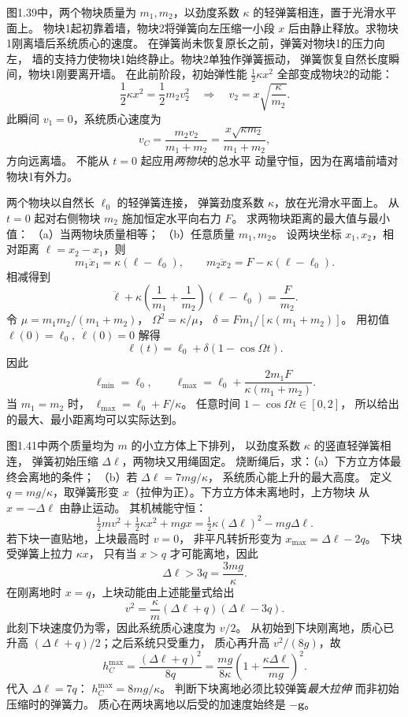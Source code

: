 图1.39中，两个物块质量为 $m_1,m_2$，以劲度系数
$\kappa$ 的轻弹簧相连，置于光滑水平面上。
物块1起初靠着墙，物块2将弹簧向左压缩一小段
$x$ 后由静止释放。求物块1刚离墙后系统质心的速度。
\exsolution
在弹簧尚未恢复原长之前，弹簧对物块1的压力向左，
墙的支持力使物块1始终静止。物块2单独作弹簧振动，
弹簧恢复自然长度瞬间，物块1刚要离开墙。
在此前阶段，初始弹性能
$\tfrac12\kappa x^2$ 全部变成物块2的动能：
\[
\frac12\kappa x^2=\frac12m_2v_2^2
\quad\Longrightarrow\quad
v_2=x\sqrt{\frac{\kappa}{m_2}}.
\]
此瞬间 $v_1=0$，系统质心速度为
\[
\boxed{v_C=\frac{m_2v_2}{m_1+m_2}
=\frac{x\sqrt{\kappa m_2}}{m_1+m_2}},
\]
方向远离墙。
\excheck 不能从 $t=0$ 起应用\emph{两物块}的总水平
动量守恒，因为在离墙前墙对物块1有外力。

两个物块以自然长 $\ell_0$ 的轻弹簧连接，
弹簧劲度系数 $\kappa$，放在光滑水平面上。
从 $t=0$ 起对右侧物块 $m_2$ 施加恒定水平向右力 $F$。
求两物块距离的最大值与最小值：
（a）当两物块质量相等；
（b）任意质量 $m_1,m_2$。
\exsolution
设两块坐标 $x_1,x_2$，相对距离
$\ell=x_2-x_1$，则
\[
m_1\ddot x_1=\kappa(\ell-\ell_0),\qquad
m_2\ddot x_2=F-\kappa(\ell-\ell_0).
\]
相减得到
\[
\ddot\ell+\kappa\left(\frac1{m_1}+\frac1{m_2}\right)
(\ell-\ell_0)=\frac F{m_2}.
\]
令 $\mu=m_1m_2/(m_1+m_2)$，
$\Omega^2=\kappa/\mu$，
$\delta=Fm_1/[\kappa(m_1+m_2)]$。
用初值 $\ell(0)=\ell_0,\ \dot\ell(0)=0$ 解得
\[
\ell(t)=\ell_0+\delta(1-\cos\Omega t).
\]
因此
\[
\boxed{\ell_{\min}=\ell_0,\qquad
\ell_{\max}=\ell_0+\frac{2m_1F}{\kappa(m_1+m_2)}}.
\]
当 $m_1=m_2$ 时，
$\boxed{\ell_{\max}=\ell_0+F/\kappa}$。
\excheck 任意时间 $1-\cos\Omega t\in[0,2]$，
所以给出的最大、最小距离均可以实际达到。

图1.41中两个质量均为 $m$ 的小立方体上下排列，
以劲度系数 $\kappa$ 的竖直轻弹簧相连，
弹簧初始压缩 $\Delta\ell$，两物块又用绳固定。
烧断绳后，求：（a）下方立方体最终会离地的条件；
（b）若 $\Delta\ell=7mg/\kappa$，
系统质心能上升的最大高度。
\exsolution
定义 $q=mg/\kappa$，取弹簧形变
$x$（拉伸为正）。下方立方体未离地时，上方物块
从 $x=-\Delta\ell$ 由静止运动。
其机械能守恒：
\[
\tfrac12mv^2+\tfrac12\kappa x^2+mgx
=\tfrac12\kappa(\Delta\ell)^2-mg\Delta\ell.
\]
若下块一直贴地，上块最高时 $v=0$，
非平凡转折形变为
$x_{\max}=\Delta\ell-2q$。
下块受弹簧上拉力 $\kappa x$，
只有当 $x>q$ 才可能离地，因此
\[
\boxed{\Delta\ell>3q=\frac{3mg}{\kappa}}.
\]
在刚离地时 $x=q$，上块动能由上述能量式给出
\[
v^2=\frac{\kappa}{m}(\Delta\ell+q)(\Delta\ell-3q).
\]
此刻下块速度仍为零，因此系统质心速度为 $v/2$。
从初始到下块刚离地，质心已升高
$(\Delta\ell+q)/2$；之后系统只受重力，
质心再升高 $v^2/(8g)$，故
\[
\boxed{h_C^{\max}=
\frac{(\Delta\ell+q)^2}{8q}
=\frac{mg}{8\kappa}
\left(1+\frac{\kappa\Delta\ell}{mg}\right)^2}.
\]
代入 $\Delta\ell=7q$：
$\boxed{h_C^{\max}=8mg/\kappa}$。
\excheck 判断下块离地必须比较弹簧\emph{最大拉伸}
而非初始压缩时的弹簧力。
质心在两块离地以后受的加速度始终是 $-\bm g$。

